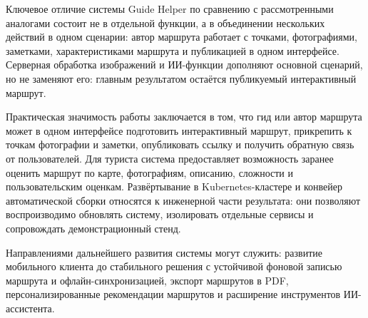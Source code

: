 Ключевое отличие системы Guide Helper по сравнению с рассмотренными аналогами
состоит не в отдельной функции, а в объединении нескольких действий в одном
сценарии: автор маршрута работает с точками, фотографиями, заметками,
характеристиками маршрута и публикацией в одном интерфейсе. Серверная обработка
изображений и ИИ-функции дополняют основной сценарий, но не заменяют его:
главным результатом остаётся публикуемый интерактивный маршрут.

Практическая значимость работы заключается в том, что гид или автор маршрута
может в одном интерфейсе подготовить интерактивный маршрут, прикрепить к точкам
фотографии и заметки, опубликовать ссылку и получить обратную связь от
пользователей. Для туриста система предоставляет возможность заранее оценить
маршрут по карте, фотографиям, описанию, сложности и пользовательским оценкам.
Развёртывание в Kubernetes-кластере и конвейер автоматической сборки относятся к
инженерной части результата: они позволяют воспроизводимо обновлять систему,
изолировать отдельные сервисы и сопровождать демонстрационный стенд.

Направлениями дальнейшего развития системы могут служить: развитие мобильного
клиента до стабильного решения с устойчивой фоновой записью маршрута и
офлайн-синхронизацией, экспорт маршрутов в PDF, персонализированные рекомендации
маршрутов и расширение инструментов ИИ-ассистента.
